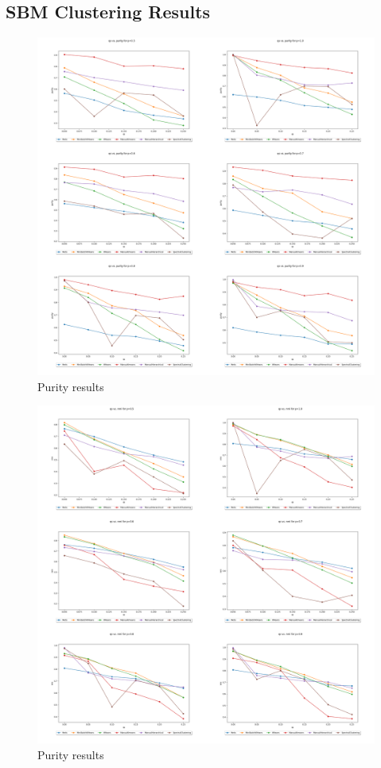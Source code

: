 \documentclass{article}
\begin{document}
\subsection{SBM Clustering Results}
\begin{figure}[H]
    \label{fig:results_purity}
    \centering
    \includegraphics[width=1.15\textwidth]{results/results_purity.png}
    \caption[Clustering purity results]{Purity results}
\end{figure}

\begin{figure}[H]
    \label{fig:results_nmi}
    \centering
    \includegraphics[width=1.15\textwidth]{results/results_nmi.png}
    \caption[Clustering NMI results]{Purity results}
\end{figure}
\end{document}
